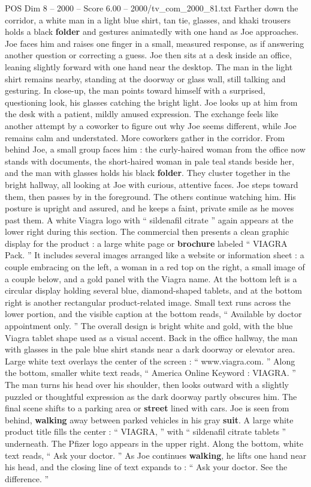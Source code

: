 \begin{textsample}{POS Dim 8 – 2000 – Score 6.00 – 2000/tv\_com\_2000\_81.txt}
Farther down the corridor, a white man in a light blue shirt, tan tie, glasses, and khaki trousers holds a black \textbf{folder} and gestures animatedly with one hand as Joe approaches.
Joe faces him and raises one finger in a small, measured response, as if answering another question or correcting a guess.
Joe then sits at a desk inside an office, leaning slightly forward with one hand near the desktop.
The man in the light shirt remains nearby, standing at the doorway or glass wall, still talking and gesturing.
In close-up, the man points toward himself with a surprised, questioning look, his glasses catching the bright light.
Joe looks up at him from the desk with a patient, mildly amused expression.
The exchange feels like another attempt by a coworker to figure out why Joe seems different, while Joe remains calm and understated.
More coworkers gather in the corridor.
From behind Joe, a small group faces him : the curly-haired woman from the office now stands with documents, the short-haired woman in pale teal stands beside her, and the man with glasses holds his black \textbf{folder}.
They cluster together in the bright hallway, all looking at Joe with curious, attentive faces.
Joe steps toward them, then passes by in the foreground.
The others continue watching him.
His posture is upright and assured, and he keeps a faint, private smile as he moves past them.
A white Viagra logo with “ sildenafil citrate ” again appears at the lower right during this section.
The commercial then presents a clean graphic display for the product : a large white page or \textbf{brochure} labeled “ VIAGRA Pack. ” It includes several images arranged like a website or information sheet : a couple embracing on the left, a woman in a red top on the right, a small image of a couple below, and a gold panel with the Viagra name.
At the bottom left is a circular display holding several blue, diamond-shaped tablets, and at the bottom right is another rectangular product-related image.
Small text runs across the lower portion, and the visible caption at the bottom reads, “ Available by doctor appointment only. ” The overall design is bright white and gold, with the blue Viagra tablet shape used as a visual accent.
Back in the office hallway, the man with glasses in the pale blue shirt stands near a dark doorway or elevator area.
Large white text overlays the center of the screen : “ www.viagra.com. ” Along the bottom, smaller white text reads, “ America Online Keyword : VIAGRA. ” The man turns his head over his shoulder, then looks outward with a slightly puzzled or thoughtful expression as the dark doorway partly obscures him.
The final scene shifts to a parking area or \textbf{street} lined with cars.
Joe is seen from behind, \textbf{walking} away between parked vehicles in his gray \textbf{suit}.
A large white product title fills the center : “ VIAGRA, ” with “ sildenafil citrate tablets ” underneath.
The Pfizer logo appears in the upper right.
Along the bottom, white text reads, “ Ask your doctor. ” As Joe continues \textbf{walking}, he lifts one hand near his head, and the closing line of text expands to : “ Ask your doctor.
See the difference. ”

\end{textsample}
